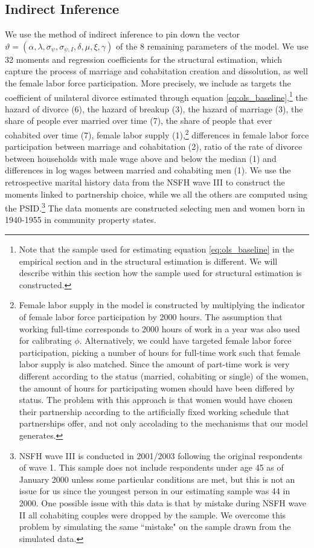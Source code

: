 \documentclass[12pt]{article}
\numberwithin{table}{section}
\begin{document}
\subsection{Indirect Inference}
We use the method of indirect inference \citep{gourieroux1993} to pin down the vector $\vartheta=(\alpha, \lambda, \sigma_\psi, \sigma_{\psi,I}, \delta, \mu, \xi, \gamma )$ of the 8 remaining parameters of the model. We use 32 moments and regression coefficients for the structural estimation, which capture the process of marriage and cohabitation creation and dissolution, as well the female labor force participation. More precisely, we include as targets the coefficient of unilateral divorce estimated through equation \ref{eq:ols_baseline},\footnote{Note that the sample used for estimating equation \ref{eq:ols_baseline} in the empirical section and in the structural estimation is different. We will describe within this section how the sample used for structural estimation is constructed.} the hazard of divorce (6), the hazard of breakup (3), the hazard of marriage (3), the share of people ever married over time (7), the share of people that ever cohabited over time (7), female labor supply (1),\footnote{Female labor supply in the model is constructed by multiplying the indicator of female labor force participation by 2000 hours. The assumption that working full-time corresponds to 2000 hours of work in a year was also used for calibrating $\phi$. Alternatively, we could have targeted female labor force participation, picking a number of hours for full-time work such that female labor supply is also matched.  Since the amount of part-time work is very different according to the status (married, cohabiting or single) of the women, the amount of hours for participating women should have been differed by status. The problem with this approach is that women would have chosen their partnership according to the artificially fixed working schedule that partnerships offer, and not only accolading to the mechanisms that our model generates.} differences in female labor force participation between marriage and cohabitation (2), ratio of the rate of divorce between households with male wage above and below the median (1) and differences in log wages between married and cohabiting men (1). We use the retrospective marital history data from the NSFH wave III to construct the moments linked to partnership choice, while we all the others are computed using the PSID.\footnote{NSFH wave III is conducted in 2001/2003 following the original respondents of wave 1. This sample does not include respondents under age 45 as of January 2000 unless some particular conditions are met, but this is not an issue for us since the youngest person in our estimating sample was 44 in 2000. One possible issue with this data is that by mistake during NSFH wave II all cohabiting couples were dropped by the sample. We overcome this problem by simulating the same ``mistake" on the sample drawn from the simulated data.} The data moments are constructed selecting men and women born in 1940-1955 in community property states.
\end{document}
